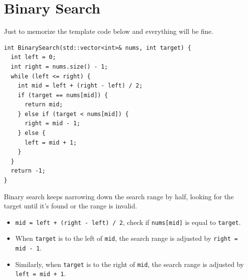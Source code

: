 \chapter{Binary Search}\label{ch:binary_search}
Just to memorize the template code below and everything will be fine.

\begin{lstlisting}
int BinarySearch(std::vector<int>& nums, int target) {
  int left = 0;
  int right = nums.size() - 1;
  while (left <= right) {
    int mid = left + (right - left) / 2;
    if (target == nums[mid]) {
      return mid;
    } else if (target < nums[mid]) {
      right = mid - 1;
    } else {
      left = mid + 1;
    }
  }
  return -1;
}
\end{lstlisting}

Binary search keeps narrowing down the search range by half, looking for the target until it's found or the range is invalid.
\begin{itemize}
\item {\colorbox{CodeBackground}{\lstinline|mid = left + (right - left) / 2|}}, check if {\colorbox{CodeBackground}{\lstinline|nums[mid]|}} is equal to {\colorbox{CodeBackground}{\lstinline|target|}}.
\item When {\colorbox{CodeBackground}{\lstinline|target|}} is to the left of {\colorbox{CodeBackground}{\lstinline|mid|}}, the search range is adjusted by {\colorbox{CodeBackground}{\lstinline|right = mid - 1|}}.
\item Similarly, when {\colorbox{CodeBackground}{\lstinline|target|}} is to the right of {\colorbox{CodeBackground}{\lstinline|mid|}},  the search range is adjusted by {\colorbox{CodeBackground}{\lstinline|left = mid + 1|}}.
\end{itemize}\mbox{}

